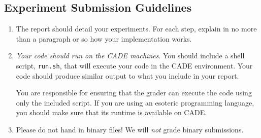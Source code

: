 
\subsection*{Experiment Submission Guidelines}
\begin{enumerate}
\item The report should detail your experiments. For each step,
  explain in no more than a paragraph or so how your implementation
  works. 

\item {\em Your code should run on the CADE machines}. You should
  include a shell script, {\tt run.sh}, that will execute your code
  in the CADE environment. Your code should produce similar output
  to what you include in your report.
  
  You are responsible for ensuring that the grader can execute the
  code using only the included script. If you are using an
  esoteric programming language, you should make sure that its
  runtime is available on CADE.

\item Please do not hand in binary files! We will {\em not} grade
  binary submissions.

\end{enumerate}

